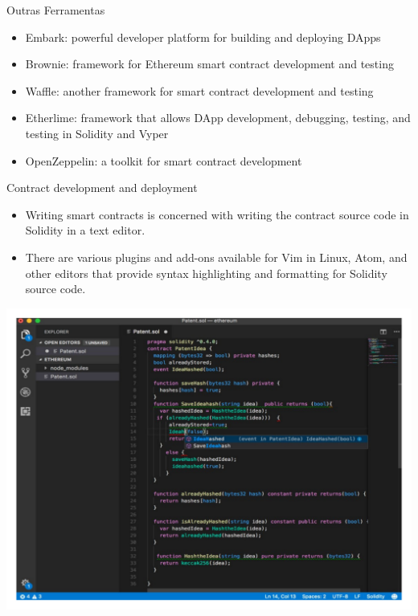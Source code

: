 \documentclass[
  pt-BR,
  ignorenonframetext,
]{beamer}
\providecommand{\tightlist}{%
  \setlength{\itemsep}{0pt}\setlength{\parskip}{0pt}}
\begin{document}
\begin{frame}[allowframebreaks]{Outras Ferramentas}
\protect\hypertarget{outras-ferramentas}{}
\begin{itemize}
\tightlist
\item
  Embark: powerful developer platform for building and deploying DApps
\item
  Brownie: framework for Ethereum smart contract development and testing
\item
  Waffle: another framework for smart contract development and testing
\item
  Etherlime: framework that allows DApp development, debugging, testing,
  and testing in Solidity and Vyper
\item
  OpenZeppelin: a toolkit for smart contract development
\end{itemize}
\end{frame}

\begin{frame}[allowframebreaks]{Contract development and deployment}
\protect\hypertarget{contract-development-and-deployment}{}
\begin{itemize}
\tightlist
\item
  Writing smart contracts is concerned with writing the contract source
  code in Solidity in a text editor.
\item
  There are various plugins and add-ons available for Vim in Linux,
  Atom, and other editors that provide syntax highlighting and
  formatting for Solidity source code.
\end{itemize}

\includegraphics{figuras/vscode-interface.pdf}
\end{frame}
\end{document}
